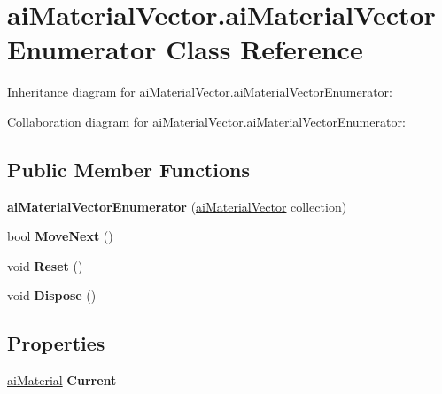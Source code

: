 \hypertarget{classai_material_vector_1_1ai_material_vector_enumerator}{\section{ai\+Material\+Vector.\+ai\+Material\+Vector\+Enumerator Class Reference}
\label{classai_material_vector_1_1ai_material_vector_enumerator}
}


Inheritance diagram for ai\+Material\+Vector.\+ai\+Material\+Vector\+Enumerator\+:


Collaboration diagram for ai\+Material\+Vector.\+ai\+Material\+Vector\+Enumerator\+:
\subsection*{Public Member Functions}
\begin{DoxyCompactItemize}
\item 
\hypertarget{classai_material_vector_1_1ai_material_vector_enumerator_a90acc13ae708ca0db4e48dcd33cdc2df}{{\bfseries ai\+Material\+Vector\+Enumerator} (\hyperlink{classai_material_vector}{ai\+Material\+Vector} collection)}\label{classai_material_vector_1_1ai_material_vector_enumerator_a90acc13ae708ca0db4e48dcd33cdc2df}

\item 
\hypertarget{classai_material_vector_1_1ai_material_vector_enumerator_a2b8607a55ca524a269dae9704ac7a09d}{bool {\bfseries Move\+Next} ()}\label{classai_material_vector_1_1ai_material_vector_enumerator_a2b8607a55ca524a269dae9704ac7a09d}

\item 
\hypertarget{classai_material_vector_1_1ai_material_vector_enumerator_ae4d3d68ca3f06e2d9e681b70cecfde95}{void {\bfseries Reset} ()}\label{classai_material_vector_1_1ai_material_vector_enumerator_ae4d3d68ca3f06e2d9e681b70cecfde95}

\item 
\hypertarget{classai_material_vector_1_1ai_material_vector_enumerator_a40fd28e1ea15e1aad5e3f4dbfb9ecb2b}{void {\bfseries Dispose} ()}\label{classai_material_vector_1_1ai_material_vector_enumerator_a40fd28e1ea15e1aad5e3f4dbfb9ecb2b}

\end{DoxyCompactItemize}
\subsection*{Properties}
\begin{DoxyCompactItemize}
\item 
\hypertarget{classai_material_vector_1_1ai_material_vector_enumerator_a9a1c2a3daaa7b58a1f8f2bdf0c173db8}{\hyperlink{classai_material}{ai\+Material} {\bfseries Current}}\label{classai_material_vector_1_1ai_material_vector_enumerator_a9a1c2a3daaa7b58a1f8f2bdf0c173db8}

\end{DoxyCompactItemize}


